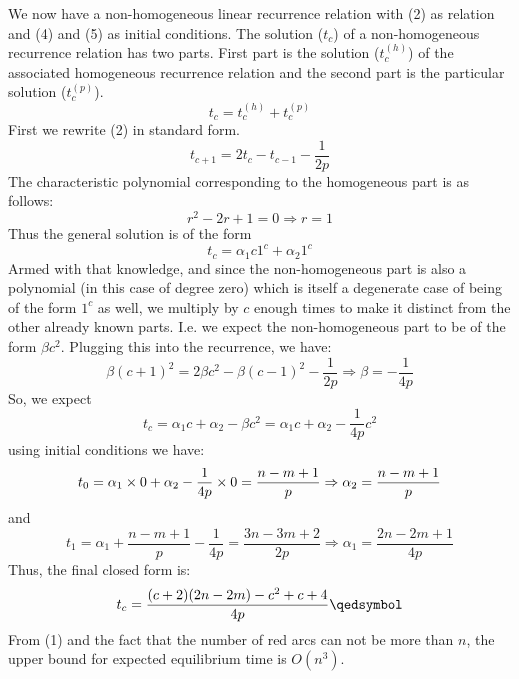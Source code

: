 \documentclass[]{book}
\theoremstyle{definition}
\begin{document}
We now have a non-homogeneous linear recurrence relation with (2) as relation and (4) and (5) as initial conditions. The solution ($t_c$)
of a non-homogeneous recurrence relation has two parts.
First part is the solution ($t^{(h)}_{c}$)
of the associated homogeneous recurrence relation and the second part is the particular solution ($t^{(p)}_{c}$).
$$
        t_c = t^{(h)}_{c} + t^{(p)}_{c}
$$
First we rewrite (2) in standard form.
\begin{equation}
    t_{c+1} = 2t_c - t_{c-1} - \frac{1}{2p}
\end{equation}
The characteristic polynomial corresponding to the homogeneous part is as follows:
$$
r^2 - 2r + 1 = 0 \Rightarrow r = 1
$$
Thus the general solution is of the form
$$
t_c = \alpha_{1}c 1^c + \alpha_{2} 1^c
$$
Armed with that knowledge, and since the non-homogeneous part is also a polynomial (in this case of degree zero) which is itself a degenerate case of being of the form $1^c$ as well, we multiply by $c$ enough times to make it distinct from the other already known parts. I.e. we expect the non-homogeneous part to be of the form $\beta c^2$. Plugging this into the recurrence, we have:
$$
\beta (c+1)^2 = 2\beta c^2 - \beta (c-1)^2 - \frac{1}{2p} \Rightarrow \beta = -\frac{1}{4p}
$$
So, we expect
$$
t_c = \alpha_1 c + \alpha_2 - \beta c^2 = \alpha_1 c + \alpha_2 -\frac{1}{4p}c^2
$$
using initial conditions we have:
$$
t_0 = \alpha_1 \times 0 + \alpha_2 - \frac{1}{4p}\times 0 = \frac{n-m+1}{p} \\
\Rightarrow \alpha_2 = \frac{n-m+1}{p}
$$
and
$$
t_1 = \alpha_1 + \frac{n-m+1}{p} -\frac{1}{4p} = \frac{3n-3m+2}{2p} \Rightarrow \alpha_1 = \frac{2n-2m+1}{4p}
$$
Thus, the final closed form is:
\begin{equation}
    t_c = \frac{(c+2)(2n-2m) - c^2 + c + 4}{4p}\\
    \qedsymbol
\end{equation}
From (1) and the fact that the number of red arcs can not be more than $n$, the upper bound for expected equilibrium time is $O(n^3)$.

\newpage
\end{document}
